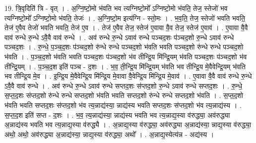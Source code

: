 \documentclass[17pt]{extarticle}
\begin{document}
19. त्रि॒वृदिति॑ त्रि - वृत् । . अ॒ग्नि॒ष्टो॒मो भ॑वति भव त्यग्निष्टो॒मो᳚ ऽग्निष्टो॒मो भ॑वति॒ तेज॒ स्तेजो॑ भव त्यग्निष्टो॒मो᳚ ऽग्निष्टो॒मो भ॑वति॒ तेजः॑ । . अ॒ग्नि॒ष्टो॒म इत्य॑ग्नि - स्तो॒मः । . भ॒व॒ति॒ तेज॒ स्तेजो॑ भवति भवति॒ तेज॑ ए॒वैव तेजो॑ भवति भवति॒ तेज॑ ए॒व । . तेज॑ ए॒वैव तेज॒ स्तेज॑ ए॒वावा वै॒व तेज॒ स्तेज॑ ए॒वाव॑ । . ए॒वावा वै॒वै वाव॑ रुन्धे रु॒न्धे ऽवै॒वै वाव॑ रुन्धे । . अव॑ रुन्धे रु॒न्धे ऽवाव॑ रुन्धे पञ्चद॒शः प॑ञ्चद॒शो रु॒न्धे ऽवाव॑ रुन्धे पञ्चद॒शः । . रु॒न्धे॒ प॒ञ्च॒द॒शः प॑ञ्चद॒शो रु॑न्धे रुन्धे पञ्चद॒शो भ॑वति भवति पञ्चद॒शो रु॑न्धे रुन्धे पञ्चद॒शो भ॑वति । . प॒ञ्च॒द॒शो भ॑वति भवति पञ्चद॒शः प॑ञ्चद॒शो भ॑व तीन्द्रि॒य मि॑न्द्रि॒यम् भ॑वति पञ्चद॒शः प॑ञ्चद॒शो भ॑व तीन्द्रि॒यम् । . प॒ञ्च॒द॒श इति॑ पञ्च - द॒शः । . भ॒व॒ ती॒न्द्रि॒य मि॑न्द्रि॒यम् भ॑वति भव तीन्द्रि॒य मे॒वैवेन्द्रि॒यम् भ॑वति भव तीन्द्रि॒य मे॒व । . इ॒न्द्रि॒य मे॒वैवेन्द्रि॒य मि॑न्द्रि॒य मे॒वावा वै॒वेन्द्रि॒य मि॑न्द्रि॒य मे॒वाव॑ । . ए॒वावा वै॒वै वाव॑ रुन्धे रु॒न्धे ऽवै॒वै वाव॑ रुन्धे । . अव॑ रुन्धे रु॒न्धे ऽवाव॑ रुन्धे सप्तद॒शः स॑प्तद॒शो रु॒न्धे ऽवाव॑ रुन्धे सप्तद॒शः । . रु॒न्धे॒ स॒प्त॒द॒शः स॑प्तद॒शो रु॑न्धे रुन्धे सप्तद॒शो भ॑वति भवति सप्तद॒शो रु॑न्धे रुन्धे सप्तद॒शो भ॑वति । . स॒प्त॒द॒शो भ॑वति भवति सप्तद॒शः स॑प्तद॒शो भ॑व त्य॒न्नाद्य॑स्या॒ न्नाद्य॑स्य भवति सप्तद॒शः स॑प्तद॒शो भ॑व त्य॒न्नाद्य॑स्य । . स॒प्त॒द॒श इति॑ सप्त - द॒शः । . भ॒व॒ त्य॒न्नाद्य॑स्या॒ न्नाद्य॑स्य भवति भव त्य॒न्नाद्य॒स्या व॑रुद्ध्या॒ अव॑रुद्ध्या अ॒न्नाद्य॑स्य भवति भव त्य॒न्नाद्य॒स्या व॑रुद्ध्यै । . अ॒न्नाद्य॒स्या व॑रुद्ध्या॒ अव॑रुद्ध्या अ॒न्नाद्य॑स्या॒ न्नाद्य॒स्या व॑रुद्ध्या॒ अथो॒ अथो॒ अव॑रुद्ध्या अ॒न्नाद्य॑स्या॒ न्नाद्य॒स्या व॑रुद्ध्या॒ अथो᳚ । . अ॒न्नाद्य॒स्येत्य॑न्न - अद्य॑स्य । \newline
\end{document}
